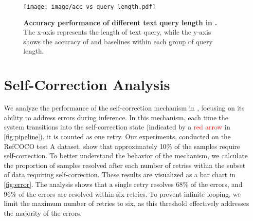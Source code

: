 \begin{figure*}[t]
\centering
\texttt{[image: image/acc\_vs\_query\_length.pdf]}
\caption{\textbf{Accuracy performance of different text query length in \methodname{}.} The x-axis represents the length of text query, while the y-axis shows the accuracy of \methodname{} and baselines within each group of query length.}
\label{fig:query_length}
\end{figure*}



\begin{table}[t]
\centering
{}
\caption{\textbf{Comparison of VLM selection for \methodname{}.} All results (accuracy) are evaluated on the RefCOCO and RefCOCO+ testA datasets~\cite{kazemzadeh_referitgame_2014}.}
\label{tab:ablation_vlm}
\end{table}

\section{Self-Correction Analysis}
\label{sec:supp_self_correction}

We analyze the performance of the self-correction mechanism in \methodname{}, focusing on its ability to address errors during inference. In this mechanism, each time the system transitions into the self-correction state (indicated by a \textcolor{red}{red arrow} in \autoref{fig:pipeline}), it is counted as one retry. Our experiments, conducted on the RefCOCO test A dataset, show that approximately 10\% of the samples require self-correction.
To better understand the behavior of the mechanism, we calculate the proportion of samples resolved after each number of retries within the subset of data requiring self-correction. These results are visualized as a bar chart in \autoref{fig:error}. The analysis shows that a single retry resolves 68\% of the errors, and 96\% of the errors are resolved within six retries.
To prevent infinite looping, we limit the maximum number of retries to six, as this threshold effectively addresses the majority of the errors.

